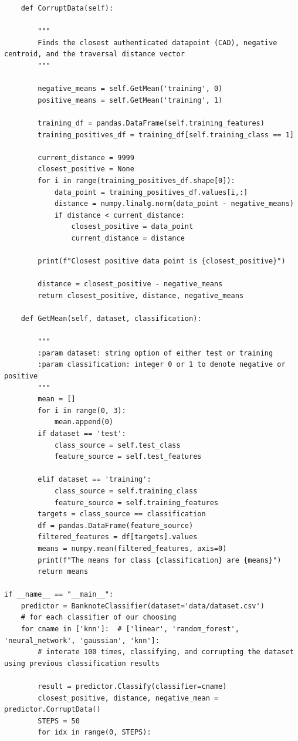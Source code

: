 \documentclass{article}
\begin{document}
\begin{appendices}
\begin{lstlisting}
    def CorruptData(self):
    
        """
        Finds the closest authenticated datapoint (CAD), negative centroid, and the traversal distance vector
        """

        negative_means = self.GetMean('training', 0)
        positive_means = self.GetMean('training', 1)

        training_df = pandas.DataFrame(self.training_features)
        training_positives_df = training_df[self.training_class == 1]

        current_distance = 9999
        closest_positive = None
        for i in range(training_positives_df.shape[0]):
            data_point = training_positives_df.values[i,:]
            distance = numpy.linalg.norm(data_point - negative_means)
            if distance < current_distance:
                closest_positive = data_point
                current_distance = distance

        print(f"Closest positive data point is {closest_positive}")

        distance = closest_positive - negative_means
        return closest_positive, distance, negative_means
        
    def GetMean(self, dataset, classification):

        """
        :param dataset: string option of either test or training
        :param classification: integer 0 or 1 to denote negative or positive
        """
        mean = []
        for i in range(0, 3):
            mean.append(0)
        if dataset == 'test':
            class_source = self.test_class
            feature_source = self.test_features

        elif dataset == 'training':
            class_source = self.training_class
            feature_source = self.training_features
        targets = class_source == classification
        df = pandas.DataFrame(feature_source)
        filtered_features = df[targets].values
        means = numpy.mean(filtered_features, axis=0)
        print(f"The means for class {classification} are {means}")
        return means

if __name__ == "__main__":
    predictor = BanknoteClassifier(dataset='data/dataset.csv')
    # for each classifier of our choosing
    for cname in ['knn']:  # ['linear', 'random_forest', 'neural_network', 'gaussian', 'knn']:
        # interate 100 times, classifying, and corrupting the dataset using previous classification results

        result = predictor.Classify(classifier=cname)
        closest_positive, distance, negative_mean = predictor.CorruptData()
        STEPS = 50
        for idx in range(0, STEPS):


\end{lstlisting}
\end{appendices}
\end{document}
